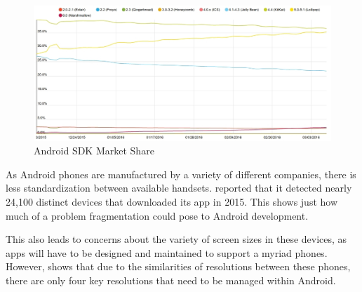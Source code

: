 \begin{figure}[ht]
	\centering
	\includegraphics[scale=0.4]{images/AndroidSDKMarketShare.jpg}
	\caption{Android SDK Market Share \citep{appbrainsdkversions}}
	\label{fig:AndroidVersions}
\end{figure}

As Android phones are manufactured by a variety of different companies, there is less standardization between available handsets. 
\cite{uniqueandroiddevices} reported that it detected nearly 24,100 distinct devices that downloaded its app in 2015.
This shows just how much of a problem fragmentation could pose to Android development.

This also leads to concerns about the variety of screen sizes in these devices, as apps will have to be designed and maintained to support a myriad phones. 
However, \cite{androidscreenfragmentation} shows that due to the similarities of resolutions between these phones, there are only four key resolutions that need to be managed within Android.